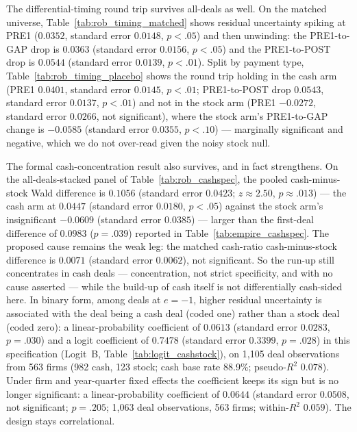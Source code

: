 The differential-timing round trip survives all-deals as well. On the matched universe, Table~\ref{tab:rob_timing_matched} shows residual uncertainty spiking at PRE1 ($0.0352$, standard error $0.0148$, $p<.05$) and then unwinding: the PRE1-to-GAP drop is $0.0363$ (standard error $0.0156$, $p<.05$) and the PRE1-to-POST drop is $0.0544$ (standard error $0.0139$, $p<.01$). Split by payment type, Table~\ref{tab:rob_timing_placebo} shows the round trip holding in the cash arm (PRE1 $0.0401$, standard error $0.0145$, $p<.01$; PRE1-to-POST drop $0.0543$, standard error $0.0137$, $p<.01$) and not in the stock arm (PRE1 $-0.0272$, standard error $0.0266$, not significant), where the stock arm's PRE1-to-GAP change is $-0.0585$ (standard error $0.0355$, $p<.10$) --- marginally significant and negative, which we do not over-read given the noisy stock null.

The formal cash-concentration result also survives, and in fact strengthens. On the all-deals-stacked panel of Table~\ref{tab:rob_cashspec}, the pooled cash-minus-stock Wald difference is $0.1056$ (standard error $0.0423$; $z\approx2.50$, $p\approx.013$) --- the cash arm at $0.0447$ (standard error $0.0180$, $p<.05$) against the stock arm's insignificant $-0.0609$ (standard error $0.0385$) --- larger than the first-deal difference of $0.0983$ ($p=.039$) reported in Table~\ref{tab:empire_cashspec}. The proposed cause remains the weak leg: the matched cash-ratio cash-minus-stock difference is $0.0071$ (standard error $0.0062$), not significant. So the run-up still concentrates in cash deals --- concentration, not strict specificity, and with no cause asserted --- while the build-up of cash itself is not differentially cash-sided here. In binary form, among deals at $e=-1$, higher residual uncertainty is associated with the deal being a cash deal (coded one) rather than a stock deal (coded zero): a linear-probability coefficient of $0.0613$ (standard error $0.0283$, $p=.030$) and a logit coefficient of $0.7478$ (standard error $0.3399$, $p=.028$) in this specification (Logit~B, Table~\ref{tab:logit_cashstock}), on 1,105 deal observations from 563 firms (982 cash, 123 stock; cash base rate 88.9\%; pseudo-$R^2$ $0.078$). Under firm and year-quarter fixed effects the coefficient keeps its sign but is no longer significant: a linear-probability coefficient of $0.0644$ (standard error $0.0508$, not significant; $p=.205$; 1,063 deal observations, 563 firms; within-$R^2$ $0.059$). The design stays correlational.
